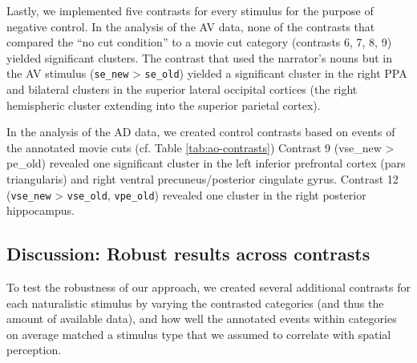 \documentclass[english]{article}
\begin{document}


Lastly, we implemented five contrasts for every stimulus for the purpose of
negative control.
In the analysis of the AV data, none of the contrasts that compared the ``no cut
condition''  to a movie cut category (contrasts 6, 7, 8, 9) yielded significant
clusters.
The contrast that used the narrator's nouns but in the AV stimulus
(\texttt{se\_new} > \texttt{se\_old}) yielded a significant cluster in the right
PPA and bilateral clusters in the superior lateral occipital cortices (the right
hemispheric cluster extending into the superior parietal cortex).

In the analysis of the AD data, we created control contrasts based on events of
the annotated movie cuts (cf. Table \ref{tab:ao-contrasts})
Contrast 9 (vse\_new > pe\_old) revealed one significant cluster in the left
inferior prefrontal cortex (pars triangularis) and right ventral
precuneus/posterior cingulate gyrus.
Contrast 12 (\texttt{vse\_new} > \texttt{vse\_old}, \texttt{vpe\_old}) revealed
one cluster in the right posterior hippocampus.


\subsection{Discussion: Robust results across contrasts}


To test the robustness of our approach, we created several additional contrasts
for each naturalistic stimulus by varying the contrasted categories (and thus
the amount of available data), and how well the annotated events within
categories on average matched a stimulus type that we assumed to correlate with
spatial perception.
\end{document}
